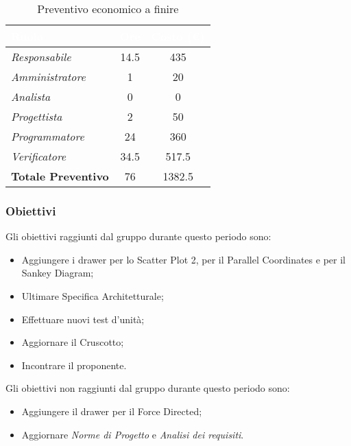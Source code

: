 \begin{table}[H]
    \renewcommand\arraystretch{1.5}
    \centering
    \begin{tabular}{|l|c|c|}
    \hline
    \rowcolor[HTML]{036400}
    \textcolor{white}{\textbf{Ruolo}} & \multicolumn{1}{l|}{\textcolor{white}{\textbf{Ore}}} & \multicolumn{1}{l|}{\textcolor{white}{\textbf{Costo (€)}}} \\ \hline
    \rowcolor[HTML]{EFEFEF}\textit{Responsabile}      & 14.5         & 435               \\ \hline
    \rowcolor[HTML]{C0C0C0}\textit{Amministratore}    & 1            & 20                \\ \hline
    \rowcolor[HTML]{EFEFEF}\textit{Analista}          & 0            & 0                 \\ \hline
    \rowcolor[HTML]{C0C0C0}\textit{Progettista}       & 2            & 50                \\ \hline
    \rowcolor[HTML]{EFEFEF}\textit{Programmatore}     & 24           & 360               \\ \hline
    \rowcolor[HTML]{C0C0C0}\textit{Verificatore}      & 34.5         & 517.5             \\ \hline
    \rowcolor[HTML]{EFEFEF}\textbf{Totale Preventivo} & 76           & 1382.5            \\ \hline
    \end{tabular}
    \caption{Preventivo economico a finire}
\end{table}

\subsubsection{Obiettivi}
Gli obiettivi raggiunti dal gruppo durante questo periodo sono:
\begin{itemize}
    \item Aggiungere i drawer per lo Scatter Plot 2, per il Parallel Coordinates e per il Sankey Diagram;
    \item Ultimare Specifica Architetturale;
    \item Effettuare nuovi test d'unità;
    \item Aggiornare il Cruscotto;
    \item Incontrare il proponente.
\end{itemize}
Gli obiettivi non raggiunti dal gruppo durante questo periodo sono:
\begin{itemize}
    \item Aggiungere il drawer per il Force Directed;
    \item Aggiornare \textit{Norme di Progetto} e \textit{Analisi dei requisiti}.
\end{itemize}

